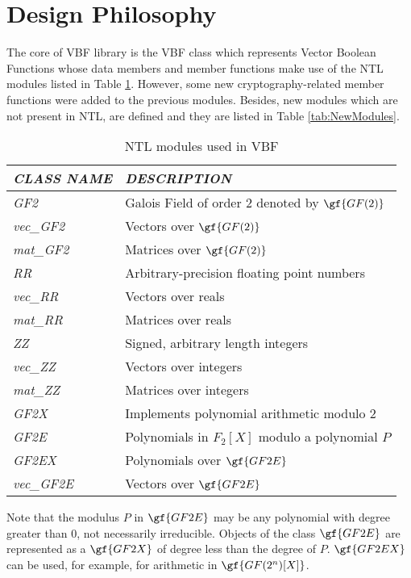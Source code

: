 \section{Design Philosophy}

The core of VBF library is the VBF class which represents Vector Boolean
Functions whose data members and member functions make use of the NTL modules
listed in Table \ref{tab:NTLModules}. However, some new cryptography-related
member functions were added to the previous modules. Besides, new modules which are not present in NTL, 
are defined and they are listed in Table \ref{tab:NewModules}.  

\begin{table}[htbp]%
\caption{NTL modules used in VBF\label{tab:NTLModules}}{%
\begin{tabular}{|l|l|}
\hline
\em{CLASS NAME} & \em{DESCRIPTION} \\\hline
\textsl{GF2} & Galois Field of order $2$ denoted by $\gf{GF(2)}$ \\\hline
\textsl{vec\_GF2} & Vectors over $\gf{GF(2)}$ \\\hline
\textsl{mat\_GF2} & Matrices over $\gf{GF(2)}$ \\\hline
\textsl{RR} & Arbitrary-precision floating point numbers \\\hline
\textsl{vec\_RR} & Vectors over reals \\\hline
\textsl{mat\_RR} & Matrices over reals \\\hline
\textsl{ZZ} & Signed, arbitrary length integers \\\hline
\textsl{vec\_ZZ} & Vectors over integers \\\hline
\textsl{mat\_ZZ} & Matrices over integers \\\hline
\textsl{GF2X} & Implements polynomial arithmetic modulo $2$ \\\hline
\textsl{GF2E} & Polynomials in $F_2[X]$ modulo a polynomial $P$ \\\hline
\textsl{GF2EX} & Polynomials over $\gf{GF2E}$ \\\hline
\textsl{vec\_GF2E} & Vectors over $\gf{GF2E}$ \\\hline
\end{tabular}}
\end{table}%

Note that the modulus $P$ in $\gf{GF2E}$ may be any polynomial with degree
greater than $0$, not necessarily irreducible. Objects of the class $\gf{GF2E}$ are
represented as a $\gf{GF2X}$ of degree less than the degree of $P$. $\gf{GF2EX}$
can be used, for example, for arithmetic in $\gf{GF(2^n)[X]}$. 

